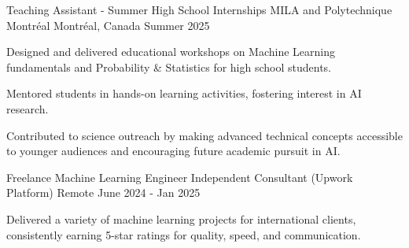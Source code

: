 

\begin{cventries}

    \cventry
    {Teaching Assistant - Summer High School Internships} %
    {MILA and Polytechnique Montréal} %
    {Montréal, Canada} %
    {Summer 2025} %
    {
      \begin{cvitems} %
        \item {Designed and delivered educational workshops on Machine Learning fundamentals and Probability \& Statistics for high school students.}
        \item {Mentored students in hands-on learning activities, fostering interest in AI research.}
        \item {Contributed to science outreach by making advanced technical concepts accessible to younger audiences and encouraging future academic pursuit in AI.}
      \end{cvitems}
    }
    
    \cventry
    {Freelance Machine Learning Engineer} %
    {Independent Consultant (Upwork Platform)} %
    {Remote} %
    {June 2024 - Jan 2025} %
    {
      \begin{cvitems} %
        \item {Delivered a variety of machine learning projects for international clients, consistently earning 5-star ratings for quality, speed, and communication.}
      \end{cvitems}
    }


\end{cventries}

